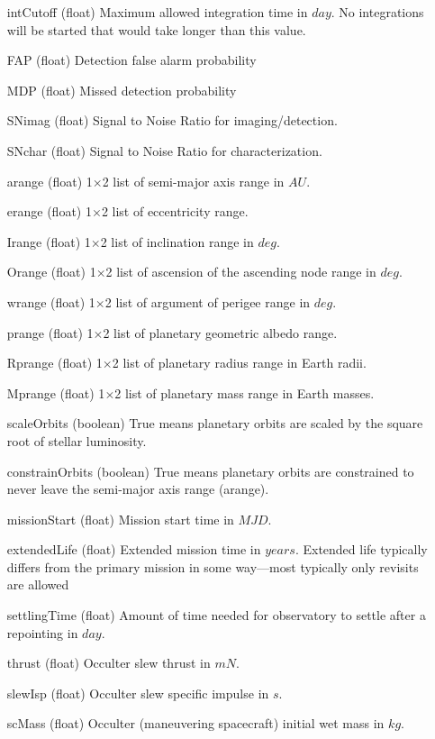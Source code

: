\documentclass[cleanfoot]{asme2ej}
\begin{document}
\begin{itemize}[leftmargin=1in,font={\ttfamily}]
\item[intCutoff] (float)  Maximum allowed integration time in $ day $. No integrations will be started that would take longer than this value.
\item[FAP] (float) Detection false alarm probability
\item[MDP] (float) Missed detection probability
\item[SNimag] (float) Signal to Noise Ratio for imaging/detection.
\item[SNchar] (float) Signal to Noise Ratio for characterization.
\item[arange] (float) 1$\times$2 list of semi-major axis range in $ AU $. 
\item[erange] (float) 1$\times$2 list of eccentricity range.
\item[Irange] (float) 1$\times$2 list of inclination range in $ deg $.  
\item[Orange] (float) 1$\times$2 list of ascension of the ascending node range in $ deg $.  
\item[wrange] (float) 1$\times$2 list of argument of perigee range in $ deg $. 
\item[prange] (float) 1$\times$2 list of planetary geometric albedo range.  
\item[Rprange] (float) 1$\times$2 list of planetary radius range in Earth radii.  
\item[Mprange] (float) 1$\times$2 list of planetary mass range in Earth masses.  
\item [scaleOrbits] (boolean) True means planetary orbits are scaled by the square root of stellar luminosity. 
\item[constrainOrbits] (boolean) True means planetary orbits are constrained to never leave the semi-major axis range (arange).
\item[missionStart] (float) Mission start time in $ MJD $. 
\item[extendedLife] (float) Extended mission time in $ years $.  Extended life typically differs from the primary mission in some way---most typically only revisits are allowed
\item[settlingTime] (float) Amount of time needed for observatory to settle after a repointing in $ day $.           
\item[thrust] (float) Occulter slew thrust in $ mN $.
\item[slewIsp] (float) Occulter slew specific impulse in $ s $.
\item[scMass] (float) Occulter (maneuvering spacecraft) initial wet mass in $ kg $. 

\end{itemize}
\end{document}
